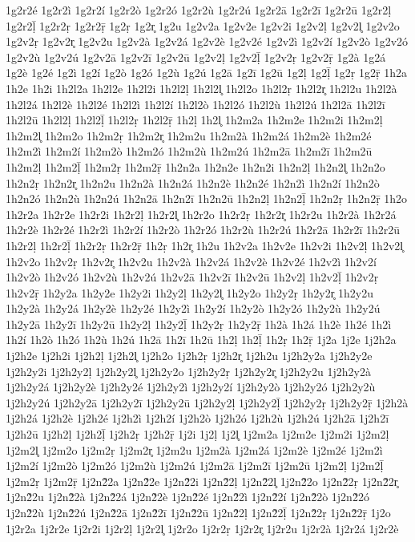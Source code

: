 {1g2r2é
1g2r2ì
1g2r2í
1g2r2ò
1g2r2ó
1g2r2ù
1g2r2ú
1g2r2ā
1g2r2ī
1g2r2ū
1g2r2ḷ
1g2r2ḹ
1g2r2ṛ
1g2r2ṝ
1g2ṛ
1g2r̥
1g2u
1g2v2a
1g2v2e
1g2v2i
1g2v2ḷ
1g2v2l̥
1g2v2o
1g2v2ṛ
1g2v2r̥
1g2v2u
1g2v2à
1g2v2á
1g2v2è
1g2v2é
1g2v2ì
1g2v2í
1g2v2ò
1g2v2ó
1g2v2ù
1g2v2ú
1g2v2ā
1g2v2ī
1g2v2ū
1g2v2ḷ
1g2v2ḹ
1g2v2ṛ
1g2v2ṝ
1g2à
1g2á
1g2è
1g2é
1g2ì
1g2í
1g2ò
1g2ó
1g2ù
1g2ú
1g2ā
1g2ī
1g2ū
1g2ḷ
1g2ḹ
1g2ṛ
1g2ṝ
1h2a
1h2e
1h2i
1h2l2a
1h2l2e
1h2l2i
1h2l2ḷ
1h2l2l̥
1h2l2o
1h2l2ṛ
1h2l2r̥
1h2l2u
1h2l2à
1h2l2á
1h2l2è
1h2l2é
1h2l2ì
1h2l2í
1h2l2ò
1h2l2ó
1h2l2ù
1h2l2ú
1h2l2ā
1h2l2ī
1h2l2ū
1h2l2ḷ
1h2l2ḹ
1h2l2ṛ
1h2l2ṝ
1h2ḷ
1h2l̥
1h2m2a
1h2m2e
1h2m2i
1h2m2ḷ
1h2m2l̥
1h2m2o
1h2m2ṛ
1h2m2r̥
1h2m2u
1h2m2à
1h2m2á
1h2m2è
1h2m2é
1h2m2ì
1h2m2í
1h2m2ò
1h2m2ó
1h2m2ù
1h2m2ú
1h2m2ā
1h2m2ī
1h2m2ū
1h2m2ḷ
1h2m2ḹ
1h2m2ṛ
1h2m2ṝ
1h2n2a
1h2n2e
1h2n2i
1h2n2ḷ
1h2n2l̥
1h2n2o
1h2n2ṛ
1h2n2r̥
1h2n2u
1h2n2à
1h2n2á
1h2n2è
1h2n2é
1h2n2ì
1h2n2í
1h2n2ò
1h2n2ó
1h2n2ù
1h2n2ú
1h2n2ā
1h2n2ī
1h2n2ū
1h2n2ḷ
1h2n2ḹ
1h2n2ṛ
1h2n2ṝ
1h2o
1h2r2a
1h2r2e
1h2r2i
1h2r2ḷ
1h2r2l̥
1h2r2o
1h2r2ṛ
1h2r2r̥
1h2r2u
1h2r2à
1h2r2á
1h2r2è
1h2r2é
1h2r2ì
1h2r2í
1h2r2ò
1h2r2ó
1h2r2ù
1h2r2ú
1h2r2ā
1h2r2ī
1h2r2ū
1h2r2ḷ
1h2r2ḹ
1h2r2ṛ
1h2r2ṝ
1h2ṛ
1h2r̥
1h2u
1h2v2a
1h2v2e
1h2v2i
1h2v2ḷ
1h2v2l̥
1h2v2o
1h2v2ṛ
1h2v2r̥
1h2v2u
1h2v2à
1h2v2á
1h2v2è
1h2v2é
1h2v2ì
1h2v2í
1h2v2ò
1h2v2ó
1h2v2ù
1h2v2ú
1h2v2ā
1h2v2ī
1h2v2ū
1h2v2ḷ
1h2v2ḹ
1h2v2ṛ
1h2v2ṝ
1h2y2a
1h2y2e
1h2y2i
1h2y2ḷ
1h2y2l̥
1h2y2o
1h2y2ṛ
1h2y2r̥
1h2y2u
1h2y2à
1h2y2á
1h2y2è
1h2y2é
1h2y2ì
1h2y2í
1h2y2ò
1h2y2ó
1h2y2ù
1h2y2ú
1h2y2ā
1h2y2ī
1h2y2ū
1h2y2ḷ
1h2y2ḹ
1h2y2ṛ
1h2y2ṝ
1h2à
1h2á
1h2è
1h2é
1h2ì
1h2í
1h2ò
1h2ó
1h2ù
1h2ú
1h2ā
1h2ī
1h2ū
1h2ḷ
1h2ḹ
1h2ṛ
1h2ṝ
1j2a
1j2e
1j2h2a
1j2h2e
1j2h2i
1j2h2ḷ
1j2h2l̥
1j2h2o
1j2h2ṛ
1j2h2r̥
1j2h2u
1j2h2y2a
1j2h2y2e
1j2h2y2i
1j2h2y2ḷ
1j2h2y2l̥
1j2h2y2o
1j2h2y2ṛ
1j2h2y2r̥
1j2h2y2u
1j2h2y2à
1j2h2y2á
1j2h2y2è
1j2h2y2é
1j2h2y2ì
1j2h2y2í
1j2h2y2ò
1j2h2y2ó
1j2h2y2ù
1j2h2y2ú
1j2h2y2ā
1j2h2y2ī
1j2h2y2ū
1j2h2y2ḷ
1j2h2y2ḹ
1j2h2y2ṛ
1j2h2y2ṝ
1j2h2à
1j2h2á
1j2h2è
1j2h2é
1j2h2ì
1j2h2í
1j2h2ò
1j2h2ó
1j2h2ù
1j2h2ú
1j2h2ā
1j2h2ī
1j2h2ū
1j2h2ḷ
1j2h2ḹ
1j2h2ṛ
1j2h2ṝ
1j2i
1j2ḷ
1j2l̥
1j2m2a
1j2m2e
1j2m2i
1j2m2ḷ
1j2m2l̥
1j2m2o
1j2m2ṛ
1j2m2r̥
1j2m2u
1j2m2à
1j2m2á
1j2m2è
1j2m2é
1j2m2ì
1j2m2í
1j2m2ò
1j2m2ó
1j2m2ù
1j2m2ú
1j2m2ā
1j2m2ī
1j2m2ū
1j2m2ḷ
1j2m2ḹ
1j2m2ṛ
1j2m2ṝ
1j2n2̃2a
1j2n2̃2e
1j2n2̃2i
1j2n2̃2ḷ
1j2n2̃2l̥
1j2n2̃2o
1j2n2̃2ṛ
1j2n2̃2r̥
1j2n2̃2u
1j2n2̃2à
1j2n2̃2á
1j2n2̃2è
1j2n2̃2é
1j2n2̃2ì
1j2n2̃2í
1j2n2̃2ò
1j2n2̃2ó
1j2n2̃2ù
1j2n2̃2ú
1j2n2̃2ā
1j2n2̃2ī
1j2n2̃2ū
1j2n2̃2ḷ
1j2n2̃2ḹ
1j2n2̃2ṛ
1j2n2̃2ṝ
1j2o
1j2r2a
1j2r2e
1j2r2i
1j2r2ḷ
1j2r2l̥
1j2r2o
1j2r2ṛ
1j2r2r̥
1j2r2u
1j2r2à
1j2r2á
1j2r2è
}
